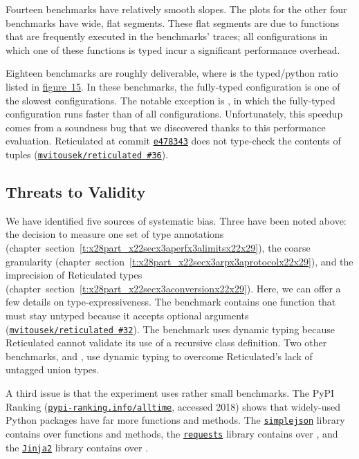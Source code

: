 \documentclass[ twoside,open=right,titlepage,numbers=noenddot,headinclude,%
                footinclude=true,cleardoublepage=empty,abstract=off,
                BCOR=5mm,paper=a4,fontsize=11pt,%
                ngerman,american,%
                parts,pdfspacing]{scrreprt}
\newcommand{\SecRef}[2]{section~#1}
\newcommand{\SecRefLocal}[3]{\hyperref[#1]{\SecRef{#2}{#3}}}
\newcommand{\Scribtexttt}[1]{{\texttt{#1}}}
\newcommand{\Ssubsubsection}[2]{\subsubsection[#1]{#2}}
\newcommand{\Snolinkurl}[1]{\nolinkurl{#1}}
\newcommand{\FigureRef}[2]{#1}
\renewcommand{\Ssubsubsection}[2]{\subsection[#1]{#2}}
\renewcommand{\SecRefLocal}[3]{section~\ref{#1}}
\begin{document}
Fourteen benchmarks have relatively smooth slopes.
The plots for the other four
 benchmarks have wide, flat segments.
These flat segments are due to functions that are frequently executed
 in the benchmarks{'} traces; all configurations in which one of these functions
 is typed incur a significant performance overhead.

Eighteen benchmarks are roughly deliverable, where  is
 the typed/python ratio listed in \hyperref[t:x28counter_x28x22figurex22_x22figx3arpx3aratiox22x29x29]{figure~\FigureRef{15}{t:x28counter_x28x22figurex22_x22figx3arpx3aratiox22x29x29}}.
In these benchmarks, the fully{-}typed configuration is one of the slowest configurations.
The notable exception is , in which the fully{-}typed configuration
 runs faster than  of all configurations.
Unfortunately, this speedup comes from a soundness bug that we discovered
 thanks to this performance evaluation.
Reticulated
 at commit \href{https://github.com/mvitousek/reticulated/commit/e478343ce7c0f2bc50d897b0ad38055e8fd9487d}{\Scribtexttt{e478343}} does not type{-}check the contents of tuples
 (\href{https://github.com/mvitousek/reticulated/issues/36}{\Scribtexttt{mvitousek/reticulated \#36}}).

\Ssubsubsection{Threats to Validity}{Threats to Validity}\label{t:x28part_x22secx3arpx3athreatsx22x29}

We have identified five sources of systematic bias.
Three have been noted above:
 the decision to measure one set of type annotations (chapter~\SecRefLocal{t:x28part_x22secx3aperfx3alimitsx22x29}{3.2.3}{Known Limitations}),
 the coarse granularity (chapter~\SecRefLocal{t:x28part_x22secx3arpx3aprotocolx22x29}{3.6.1}{Protocol}),
 and the imprecision of Reticulated types (chapter~\SecRefLocal{t:x28part_x22secx3aconversionx22x29}{3.4.1}{From Programs to Benchmarks}).
Here, we can offer a few details on type{-}expressiveness.
The  benchmark contains one function that must stay untyped because
 it accepts optional arguments (\href{https://github.com/mvitousek/reticulated/issues/32}{\Scribtexttt{mvitousek/reticulated \#32}}).
The  benchmark uses dynamic typing because Reticulated cannot validate
 its use of a recursive class definition.
Two other benchmarks,  and ,
 use dynamic typing to overcome Reticulated{'}s lack of
 untagged union types.

A third issue is that the experiment uses rather small benchmarks.
The PyPI Ranking (\href{http://pypi-ranking.info/alltime}{\Snolinkurl{pypi-ranking.info/alltime}}, accessed 2018) shows that widely{-}used
 Python packages have far more functions and methods.
The
\href{https://github.com/simplejson/simplejson}{\Scribtexttt{simplejson}}
library contains over  functions and methods, the
\href{https://github.com/kennethreitz/requests}{\Scribtexttt{requests}}
library contains over , and the
\href{https://github.com/pallets/jinja/tree/master/jinja2}{\Scribtexttt{Jinja2}}
library contains over .
\end{document}
